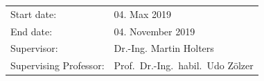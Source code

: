 \begin{titlepage}
\begin{center}
        \vfill
        \begin{tabular}{ll}
            Start date:            & 04. Max 2019                       \\
            End date:              & 04. November 2019                   \\
            Supervisor:            & Dr.-Ing. Martin Holters            \\
            Supervising Professor: & Prof.~Dr.-Ing.~habil.~Udo Z\"olzer \\
        \end{tabular}
    \end{center}
    \vspace{2cm}

\end{titlepage}

